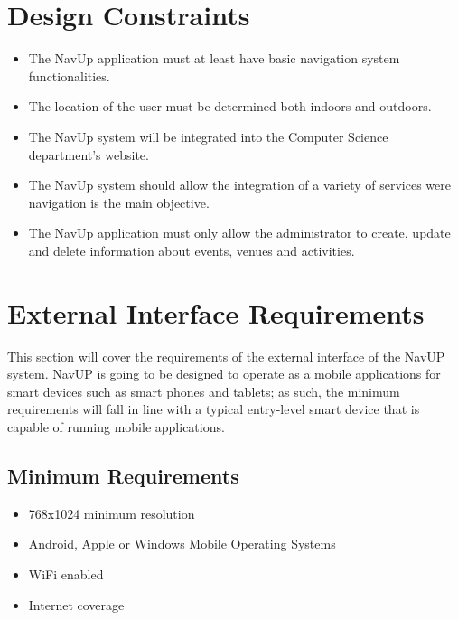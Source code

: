 \documentclass[12pt,a4paper]{article}
\begin{document}


\tableofcontents
\newpage

\section{Design Constraints}
	\begin{itemize}
		\item The NavUp application must at least have basic navigation system functionalities.
		\item The location  of the user must be determined both indoors and outdoors.
		\item The NavUp system will be integrated into the Computer Science department's website.
		\item The NavUp system should allow the integration of a variety of services were navigation is the main objective.
		\item The NavUp application must only allow the administrator to create, update and delete information about events, venues and activities.
		
	\end{itemize}
    
\section{External Interface Requirements}
This section will cover the requirements of the external interface of the NavUP system. NavUP is going to be designed to operate as a mobile applications for smart devices such as smart phones and tablets; as such, the minimum requirements will fall in line with a typical entry-level smart device that is capable of running mobile applications.\newline

    \subsection{Minimum Requirements}
        \begin{itemize}
            \item 768x1024 minimum resolution
            \item Android, Apple or Windows Mobile Operating Systems
            \item WiFi enabled
            \item Internet coverage
        \end{itemize}
     
\end{document}
